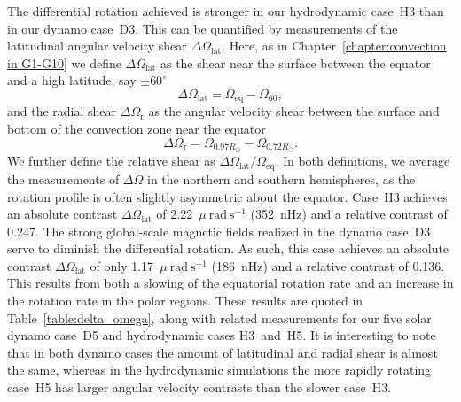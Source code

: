 The differential rotation achieved is stronger in our hydrodynamic
case~H3 than in our dynamo case~D3.
This can be quantified by measurements of the 
latitudinal angular velocity shear $\Delta \Omega_\mathrm{lat}$.  Here, as in
Chapter~\ref{chapter:convection in G1-G10} %
we define $\Delta \Omega_\mathrm{lat}$ as the shear near
the surface between the equator and a high latitude, say $\pm 60^\circ$
\begin{equation}
  \Delta \Omega_\mathrm{lat} = \Omega_\mathrm{eq} - \Omega_{60},
  \label{eq:absolute_contrast}
\end{equation}
and the radial shear $\Delta \Omega_\mathrm{r}$ as the angular
velocity shear between the surface and bottom of the convection zone
near the equator 
\begin{equation}
  \Delta \Omega_\mathrm{r} = \Omega_{0.97R_\odot} - \Omega_{0.72R_\odot}.
  \label{eq:absolute_radial_contrast}
\end{equation}
We further define the relative shear as 
$\Delta \Omega_\mathrm{lat}/\Omega_\mathrm{eq}$.
In both definitions, we average the measurements of $\Delta \Omega$
in the northern and southern hemispheres, as the rotation profile is
often slightly asymmetric about the equator.
Case~H3 achieves an absolute contrast $\Delta \Omega_\mathrm{lat}$ of
2.22~$\mu~\mathrm{rad}\:\mathrm{s}^{-1}$ (352~nHz) and a relative contrast of 0.247.
The strong global-scale magnetic fields realized in the dynamo case~D3
serve to diminish the differential rotation.  As such, this case
achieves an absolute contrast $\Delta \Omega_\mathrm{lat}$ of only 
1.17~$\mu~\mathrm{rad}\:\mathrm{s}^{-1}$ (186~nHz) and a relative contrast of 0.136.
This results from both a slowing of the equatorial rotation rate and
an increase in the rotation rate in the polar regions.  These results
are quoted in Table~\ref{table:delta_omega}, along with related
measurements for our five solar dynamo case~D5 and hydrodynamic cases 
H3~and~H5.  It is interesting to note that in both dynamo cases the
amount of latitudinal and radial shear is almost the same, whereas in
the hydrodynamic simulations the more rapidly rotating case~H5 has
larger angular velocity contrasts than the slower case~H3.


